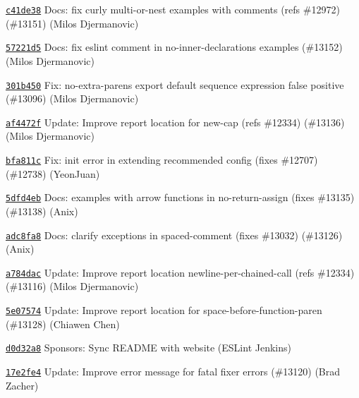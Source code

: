 \begin{DoxyItemize}
\item \href{https://github.com/eslint/eslint/commit/c41de382a330d4789488fd2dcf6db5a3163bb5d2}{\texttt{ {\ttfamily c41de38}}} Docs\+: fix curly multi-\/or-\/nest examples with comments (refs \#12972) (\#13151) (Milos Djermanovic)
\item \href{https://github.com/eslint/eslint/commit/57221d58c60e757062242f30ed574e0502fc7c31}{\texttt{ {\ttfamily 57221d5}}} Docs\+: fix eslint comment in no-\/inner-\/declarations examples (\#13152) (Milos Djermanovic)
\item \href{https://github.com/eslint/eslint/commit/301b450ecd1985ae84d1915124f4638ab2a2e6de}{\texttt{ {\ttfamily 301b450}}} Fix\+: no-\/extra-\/parens export default sequence expression false positive (\#13096) (Milos Djermanovic)
\item \href{https://github.com/eslint/eslint/commit/af4472fed794b86e63730702e4b27294a4118d09}{\texttt{ {\ttfamily af4472f}}} Update\+: Improve report location for new-\/cap (refs \#12334) (\#13136) (Milos Djermanovic)
\item \href{https://github.com/eslint/eslint/commit/bfa811ceee801fe8ba212a5c879e13743146e909}{\texttt{ {\ttfamily bfa811c}}} Fix\+: init error in extending recommended config (fixes \#12707) (\#12738) (Yeon\+Juan)
\item \href{https://github.com/eslint/eslint/commit/5dfd4eb50d84077a57950f119e5de8976070e49a}{\texttt{ {\ttfamily 5dfd4eb}}} Docs\+: examples with arrow functions in no-\/return-\/assign (fixes \#13135) (\#13138) (Anix)
\item \href{https://github.com/eslint/eslint/commit/adc8fa88c9f223b984a3519ed159a055bf933b18}{\texttt{ {\ttfamily adc8fa8}}} Docs\+: clarify exceptions in spaced-\/comment (fixes \#13032) (\#13126) (Anix)
\item \href{https://github.com/eslint/eslint/commit/a784dac8bc26f31edbca869b16d6ad91bd4e5cc4}{\texttt{ {\ttfamily a784dac}}} Update\+: Improve report location newline-\/per-\/chained-\/call (refs \#12334) (\#13116) (Milos Djermanovic)
\item \href{https://github.com/eslint/eslint/commit/5e07574a91861fdcab6888b4c6829868030c3a39}{\texttt{ {\ttfamily 5e07574}}} Update\+: Improve report location for space-\/before-\/function-\/paren (\#13128) (Chiawen Chen)
\item \href{https://github.com/eslint/eslint/commit/d0d32a8c2a6c60c7e6e2d32a054e5987efd4c263}{\texttt{ {\ttfamily d0d32a8}}} Sponsors\+: Sync README with website (ESLint Jenkins)
\item \href{https://github.com/eslint/eslint/commit/17e2fe425168e675fe7607182615e50527eedf53}{\texttt{ {\ttfamily 17e2fe4}}} Update\+: Improve error message for fatal fixer errors (\#13120) (Brad Zacher)

\end{DoxyItemize}
